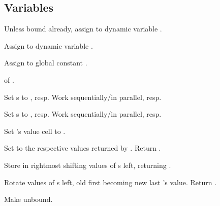 \subsection{Variables}

\begin{LIST}{1cm}

  {
  Unless bound already, assign  to dynamic variable
  . 
  }

  {
  Assign  to dynamic variable .
  }

  {
  Assign  to global constant .
  }

  {
   of .
  }

  {
  Set s to , resp. Work sequentially/in
  parallel, resp. 
  }

  {
  Set s to , resp. Work sequentially/in
  parallel, resp. 
  }

  {
  Set 's value cell to .
  }

  {
  Set  to the respective values returned by
  . Return .
  }

  {
  Store  in rightmost  shifting values of
  s left, returning . 
  }

  {
  Rotate values of s left, old first becoming new last
  's value. Return \retval{\NIL}.
  }

  {
  Make  unbound.
  }


\end{LIST}
